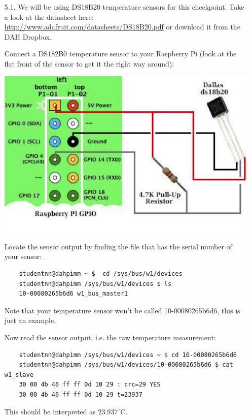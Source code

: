 \begin{enumerate}

\item [5.1.] We will be using DS18B20 temperature sensors for this checkpoint.
Take a look at the datasheet here: \url{http://www.adafruit.com/datasheets/DS18B20.pdf} or download it from the DAH Dropbox.

Connect a DS182B0 temperature sensor to your Raspberry Pi (look at the flat front of the sensor to get it the right way around):
\begin{center}
    \includegraphics[width=14cm]{figs/DS182B0}
\end{center}


%

Locate the sensor output by finding the file that has the serial number of your sensor:
\begin{verbatim} 
    studentnn@dahpimm ~ $  cd /sys/bus/w1/devices 
    studentnn@dahpimm /sys/bus/w1/devices $ ls 
    10-00080265b6d6 w1_bus_master1 
\end{verbatim}
Note that your temperature sensor won't be called 10-00080265b6d6, this is just an example.

Now read the sensor output, i.e. the raw temperature measurement:
\begin{verbatim}
    studentnn@dahpimm /sys/bus/w1/devices ~ $ cd 10-00080265b6d6
    studentnn@dahpimm /sys/bus/w1/devices/10-00080265b6d6 $ cat w1_slave 
    30 00 4b 46 ff ff 0d 10 29 : crc=29 YES 
    30 00 4b 46 ff ff 0d 10 29 t=23937 
\end{verbatim}
This should be interpreted as $23.937^{\circ}$C.


\end{enumerate}

